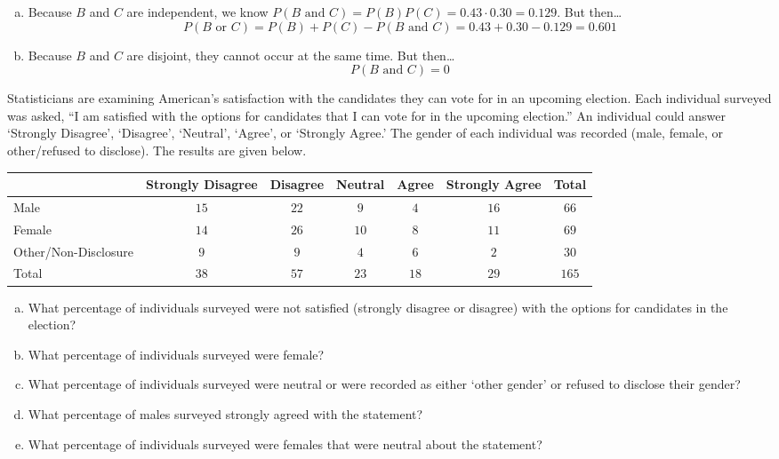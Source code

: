\documentclass[12pt,letterpaper]{exam}
\begin{document}
\begin{questions}
\begin{enumerate}[(a)]
\item Because $B$ and $C$ are independent, we know $P(B \text{ and } C)= P(B) P(C)= 0.43 \cdot 0.30= 0.129$. But then\dots
	\[
	P(B \text{ or } C)= P(B) + P(C) - P(B \text{ and } C)= 0.43 + 0.30 - 0.129= 0.601
	\] \pspace

\item Because $B$ and $C$ are disjoint, they cannot occur at the same time. But then\dots
	\[
	P(B \text{ and } C)= 0
	\]
\end{enumerate}



\newpage
\question[15] Statisticians are examining American's satisfaction with the candidates they can vote for in an upcoming election. Each individual surveyed was asked, ``I am satisfied with the options for candidates that I can vote for in the upcoming election.'' An individual could answer `Strongly Disagree', `Disagree', `Neutral', `Agree', or `Strongly Agree.' The gender of each individual was recorded (male, female, or other/refused to disclose). The results are given below. \par
	\begin{table}[ht]
	\centering
	\begin{tabular}{|l|c|c|c|c|c||c|} \hline 
	& Strongly Disagree & Disagree & Neutral & Agree & Strongly Agree & Total \\ \hline \hline
	Male & $15$ & $22$ & $9$ & $4$ & $16$ & $66$ \\ \hline
	Female & $14$ & $26$ & $10$ & $8$ & $11$ & $69$ \\ \hline
	Other/Non-Disclosure & $9$ & $9$ & $4$ & $6$ & $2$ & $30$ \\ \hline \hline
	Total & $38$ & $57$ & $23$ & $18$ & $29$ & $165$ \\ \hline
	\end{tabular}
	\end{table}

\begin{enumerate}[(a)]
\item What percentage of individuals surveyed were not satisfied (strongly disagree or disagree) with the options for candidates in the election? 
\item What percentage of individuals surveyed were female?
\item What percentage of individuals surveyed were neutral or were recorded as either `other gender' or refused to disclose their gender?
\item What percentage of males surveyed strongly agreed with the statement?
\item What percentage of individuals surveyed were females that were neutral about the statement?
\end{enumerate} 


\end{questions}
\end{document}
